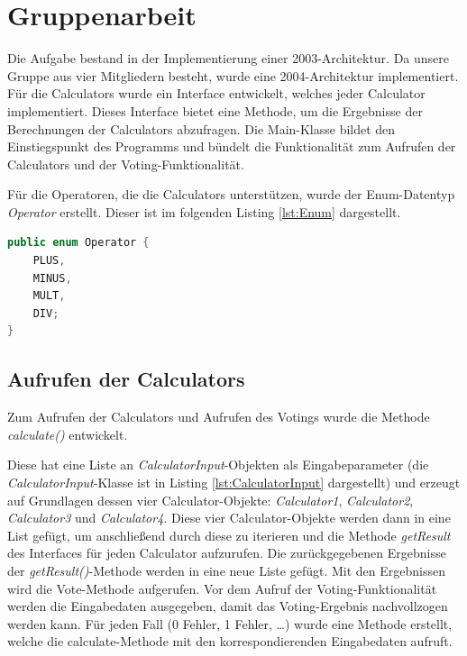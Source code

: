
\chapter{Gruppenarbeit}\label{cha:Gruppenarbeit}
Die Aufgabe bestand in der Implementierung einer 2003-Architektur. Da unsere Gruppe aus vier Mitgliedern besteht, wurde eine 2004-Architektur implementiert.
Für die Calculators wurde ein Interface entwickelt, welches jeder Calculator implementiert.
Dieses Interface bietet eine Methode, um die Ergebnisse der Berechnungen der Calculators abzufragen.
Die Main-Klasse bildet den Einstiegspunkt des Programms und bündelt die Funktionalität zum Aufrufen der Calculators und der Voting-Funktionalität.

Für die Operatoren, die die Calculators unterstützen, wurde der Enum-Datentyp \textit{Operator} erstellt. Dieser ist im folgenden Listing \ref{lst:Enum} dargestellt.

\begin{lstlisting}[language=Java,basicstyle=\scriptsize, caption= Enum-Datentyp für die Operator,label=lst:Enum]
public enum Operator {
    PLUS,
    MINUS,
    MULT,
    DIV;
}
\end{lstlisting}

\section{Aufrufen der Calculators}
Zum Aufrufen der Calculators und Aufrufen des Votings wurde die Methode \textit{calculate()} entwickelt.

Diese hat eine Liste an \textit{CalculatorInput}-Objekten als Eingabeparameter (die \textit{CalculatorInput}-Klasse ist in Listing \ref{lst:CalculatorInput} dargestellt) und erzeugt auf Grundlagen dessen vier Calculator-Objekte: \textit{Calculator1}, \textit{Calculator2}, \textit{Calculator3} und \textit{Calculator4}. Diese vier Calculator-Objekte werden dann in eine List gefügt, um anschließend durch diese zu iterieren und die Methode \textit{getResult} des Interfaces für jeden Calculator aufzurufen. Die zurückgegebenen Ergebnisse der \textit{getResult()}-Methode werden in eine neue Liste gefügt. Mit den Ergebnissen wird die Vote-Methode aufgerufen.
Vor dem Aufruf der Voting-Funktionalität werden die Eingabedaten ausgegeben, damit das Voting-Ergebnis nachvollzogen werden kann.
Für jeden Fall (0 Fehler, 1 Fehler, …) wurde eine Methode erstellt, welche die calculate-Methode mit den korrespondierenden Eingabedaten aufruft.

